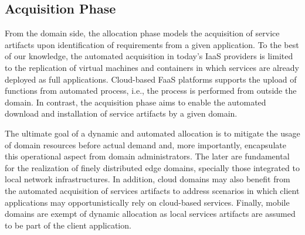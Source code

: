 


\subsection{Acquisition Phase}\label{sec:A3-E-acquisition}


From the domain side, the allocation phase models the acquisition of service artifacts upon identification of requirements from a given application. To the best of our knowledge, the automated acquisition in today's IaaS providers is limited to the replication of virtual machines and containers in which services are already deployed as full applications. Cloud-based FaaS platforms supports the upload of functions from automated process, i.e., the process is performed from outside the domain. In contrast, the acquisition phase aims to enable the automated download and installation of service artifacts by a given domain. 

The ultimate goal of a dynamic and automated allocation is to mitigate the usage of domain resources before actual demand and, more importantly, encapsulate this operational aspect from domain administrators. The later are fundamental for the realization of finely distributed edge domains, specially those integrated to local network infrastructures. In addition, cloud domains may also benefit from the automated acquisition of services artifacts to address scenarios in which client applications may opportunistically rely on cloud-based services. Finally, mobile domains are exempt of dynamic allocation as local services artifacts are assumed to be part of the client application. 



